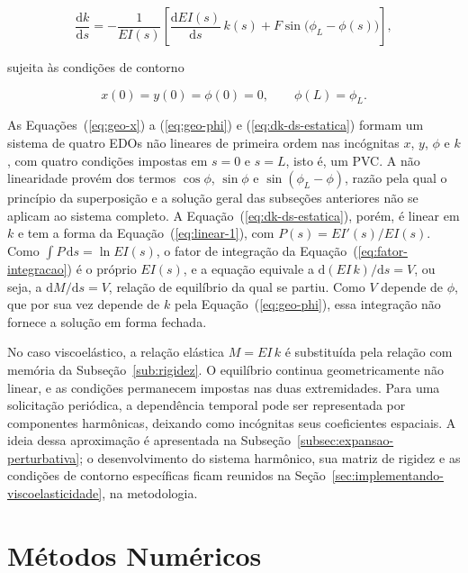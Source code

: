 \documentclass[arial,centeredequations,english,brazilian,oneside,section=TITLE]{ifes8}
\begin{document}
\begin{equation}
  \label{eq:dk-ds-estatica}
  \frac{\mathrm{d}k}{\mathrm{d}s}
  = -\frac{1}{EI(s)}\left[\frac{\mathrm{d}EI(s)}{\mathrm{d}s}\,k(s)
  + F\sin\!\big(\phi_L - \phi(s)\big)\right],
\end{equation}

sujeita às condições de contorno

\begin{equation}
  \label{eq:cc-estatica}
  x(0) = y(0) = \phi(0) = 0, \qquad \phi(L) = \phi_L.
\end{equation}

As Equações~(\ref{eq:geo-x}) a (\ref{eq:geo-phi}) e (\ref{eq:dk-ds-estatica}) formam um
sistema de quatro EDOs não lineares de primeira ordem nas incógnitas $x$, $y$, $\phi$ e
$k$, com quatro condições impostas em $s = 0$ e $s = L$, isto é, um PVC.
A não linearidade provém dos termos $\cos\phi$, $\sin\phi$ e
$\sin(\phi_L - \phi)$, razão pela qual o princípio da superposição e a solução geral
das subseções anteriores não se aplicam ao sistema completo. A
Equação~(\ref{eq:dk-ds-estatica}), porém, é linear em $k$ e tem a forma da
Equação~(\ref{eq:linear-1}), com $P(s) = EI'(s)/EI(s)$. Como $\int P\,\mathrm{d}s =
\ln EI(s)$, o fator de integração da Equação~(\ref{eq:fator-integracao}) é o próprio
$EI(s)$, e a equação equivale a $\mathrm{d}(EI\,k)/\mathrm{d}s = V$, ou seja, a
$\mathrm{d}M/\mathrm{d}s = V$, relação de equilíbrio da qual se partiu. Como $V$ depende
de $\phi$, que por sua vez depende de $k$ pela Equação~(\ref{eq:geo-phi}), essa
integração não fornece a solução em forma fechada.
 
No caso viscoelástico, a relação elástica $M=EI\,k$ é substituída pela relação com
memória da Subseção~\ref{sub:rigidez}. O equilíbrio continua geometricamente não linear,
e as condições permanecem impostas nas duas extremidades. Para uma solicitação
periódica, a dependência temporal pode ser representada por componentes harmônicas,
deixando como incógnitas seus coeficientes espaciais. A ideia dessa aproximação é
apresentada na Subseção~\ref{subsec:expansao-perturbativa}; o desenvolvimento do sistema
harmônico, sua matriz de rigidez e as condições de contorno específicas ficam reunidos
na Seção~\ref{sec:implementando-viscoelasticidade}, na metodologia.


\section{Métodos Numéricos}
\label{sec:metodos-numericos}
\end{document}
